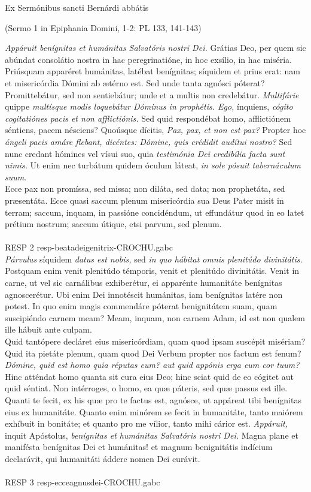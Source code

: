 \documentclass[options]{article}
\begin{document}
	Ex Sermónibus sancti Bernárdi abbátis 
	\begin{flushright}
		(Sermo 1 in Epiphania Domini, 1-2: PL 133, 141-143)
	\end{flushright}
\emph{Appáruit benígnitas et humánitas Salvatóris nostri Dei.} Grátias Deo, per quem sic abúndat consolátio nostra in hac peregrinatióne, in hoc exsílio, in hac miséria.\\
Priúsquam apparéret humánitas, latébat benígnitas; síquidem et prius erat: nam et misericórdia Dómini ab ætérno est. Sed unde tanta agnósci póterat? Promittebátur, sed non sentiebátur; unde et a multis non credebátur. \emph{Multifárie} quippe \emph{multísque modis loquebátur Dóminus in prophétis. Ego,} ínquiens, \emph{cógito cogitatiónes pacis et non afflictiónis.} Sed quid respondébat homo, afflictiónem séntiens, pacem nésciens? Quoúsque dícitis, \emph{Pax, pax, et non est pax?} Propter hoc \emph{ángeli pacis amáre flebant, dicéntes: Dómine, quis crédidit audítui nostro?} Sed nunc credant hómines vel vísui suo, quia \emph{testimónia Dei credibília facta sunt nimis.} Ut enim nec turbátum quidem óculum láteat, \emph{in sole pósuit tabernáculum suum}.\\
Ecce pax non promíssa, sed missa; non diláta, sed data; non prophetáta, sed præsentáta. Ecce quasi saccum plenum misericórdia sua Deus Pater misit in terram; saccum, inquam, in passióne concidéndum, ut effundátur quod in eo latet prétium nostrum; saccum útique, etsi parvum, sed plenum.\\
\\
RESP 2    resp-beatadeigenitrix-CROCHU.gabc
\\
 \emph{Párvulus} síquidem \emph{datus est nobis,} sed \emph{in quo hábitat omnis plenitúdo divinitátis.} Postquam enim venit plenitúdo témporis, venit et plenitúdo divinitátis. Venit in carne, ut vel sic carnálibus exhiberétur, ei apparénte humanitáte benígnitas agnoscerétur. Ubi enim Dei innotéscit humánitas, iam benígnitas latére non potest. In quo enim magis commendáre póterat benignitátem suam, quam suscipiéndo carnem meam? Meam, inquam, non carnem Adam, id est non qualem ille hábuit ante culpam.\\
Quid tantópere decláret eius misericórdiam, quam quod ipsam suscépit misériam? Quid ita pietáte plenum, quam quod Dei Verbum propter nos factum est fenum? \emph{Dómine, quid est homo quia réputas eum? aut quid appónis erga eum cor tuum?} Hinc atténdat homo quanta sit cura eius Deo; hinc sciat quid de eo cógitet aut quid séntiat. Non intérroges, o homo, ea quæ páteris, sed quæ passus est ille. Quanti te fecit, ex his quæ pro te factus est, agnósce, ut appáreat tibi benígnitas eius ex humanitáte. Quanto enim minórem se fecit in humanitáte, tanto maiórem exhíbuit in bonitáte; et quanto pro me vílior, tanto mihi cárior est. \emph{Appáruit,} inquit Apóstolus, \emph{benígnitas et humánitas Salvatóris nostri Dei.} Magna plane et manifésta benígnitas Dei et humánitas! et magnum benignitátis indícium declarávit, qui humanitáti áddere nomen Dei curávit.\\
\\
RESP 3 resp-ecceagnusdei-CROCHU.gabc
\end{document}
